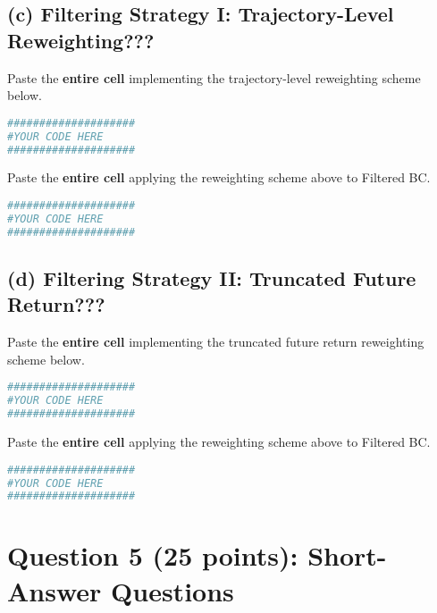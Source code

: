 \documentclass{article}
\begin{document}
        \subsection*{(c) Filtering Strategy I: Trajectory-Level Reweighting???} 
            Paste the \textbf{entire cell} implementing the trajectory-level reweighting scheme below.
            \begin{solution}
                \begin{lstlisting}[language=Python]
####################
#YOUR CODE HERE
####################
                \end{lstlisting}
            \end{solution}

            \noindent
            Paste the \textbf{entire cell} applying the reweighting scheme above to Filtered BC.
            \begin{solution}
                \begin{lstlisting}[language=Python]
####################
#YOUR CODE HERE
####################
                \end{lstlisting}
            \end{solution}

        
        \subsection*{(d) Filtering Strategy II: Truncated Future Return???} 
            Paste the \textbf{entire cell} implementing the truncated future return reweighting scheme below.
            \begin{solution}
                \begin{lstlisting}[language=Python]
####################
#YOUR CODE HERE
####################
                \end{lstlisting}
            \end{solution}

            \noindent
            Paste the \textbf{entire cell} applying the reweighting scheme above to Filtered BC.
            \begin{solution}
                \begin{lstlisting}[language=Python]
####################
#YOUR CODE HERE
####################
                \end{lstlisting}
            \end{solution}


    \section*{Question 5 (25 points): Short-Answer Questions}
\end{document}
